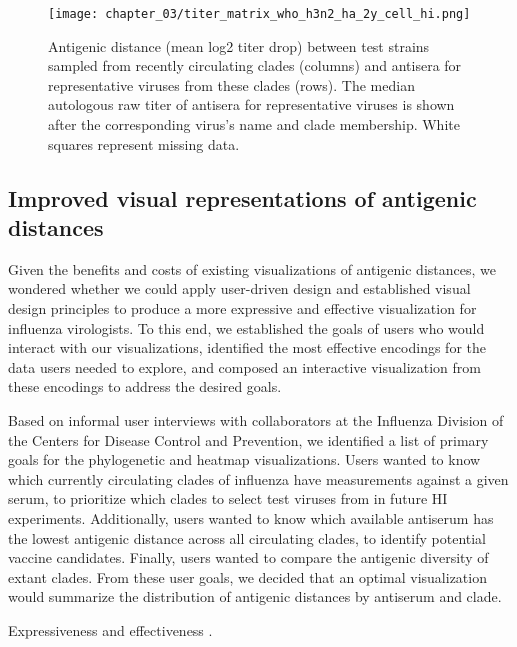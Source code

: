 \begin{figure}
  \centering
  \texttt{[image: chapter\_03/titer\_matrix\_who\_h3n2\_ha\_2y\_cell\_hi.png]}
  \caption{\label{fig:titer-matrix} Antigenic distance (mean log2 titer drop) between test strains sampled from recently circulating clades (columns) and antisera for representative viruses from these clades (rows).
    The median autologous raw titer of antisera for representative viruses is shown after the corresponding virus's name and clade membership.
    White squares represent missing data.}
\end{figure}

\subsection{Improved visual representations of antigenic distances}

Given the benefits and costs of existing visualizations of antigenic distances, we wondered whether we could apply user-driven design and established visual design principles to produce a more expressive and effective visualization for influenza virologists.
To this end, we established the goals of users who would interact with our visualizations, identified the most effective encodings for the data users needed to explore, and composed an interactive visualization from these encodings to address the desired goals.

Based on informal user interviews with collaborators at the Influenza Division of the Centers for Disease Control and Prevention, we identified a list of primary goals for the phylogenetic and heatmap visualizations.
Users wanted to know which currently circulating clades of influenza have measurements against a given serum, to prioritize which clades to select test viruses from in future HI experiments.
Additionally, users wanted to know which available antiserum has the lowest antigenic distance across all circulating clades, to identify potential vaccine candidates.
Finally, users wanted to compare the antigenic diversity of extant clades.
From these user goals, we decided that an optimal visualization would summarize the distribution of antigenic distances by antiserum and clade.

Expressiveness and effectiveness \citep{Mackinlay1986}.

